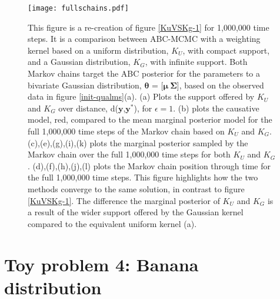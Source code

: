 \begin{figure}[H]
	\centering
	\texttt{[image: fullschains.pdf]}
	\caption{ This figure is a re-creation of figure \ref{KuVSKg-1} for 1,000,000 time steps. It is a comparison between ABC-MCMC with a weighting kernel based on a uniform distribution, $K_U$, with compact support, and a Gaussian distribution, $K_G$, with infinite support. Both Markov chains target the ABC posterior for the parameters to a bivariate Gaussian distribution, $\bm{\theta}$ = [$\bm{\mu}\ \bm{\Sigma}$], based on the observed data in figure \ref{init-qualms}(a). (a) Plots the support offered by $K_U$ and $K_G$ over distance, d($\bm{y}$,$\bm{y^*}$), for $\epsilon=1$. (b) plots the causative model, red, compared to the mean marginal posterior model for the full 1,000,000 time steps of the Markov chain based on $K_U$ and $K_G$. (c),(e),(g),(i),(k) plots the marginal posterior sampled by the Markov chain over the full 1,000,000 time steps for both $K_U$ and $K_G$. (d),(f),(h),(j),(l) plots the Markov chain position through time for the full 1,000,000 time steps. This figure highlights how the two methods converge to the same solution, in contrast to figure \ref{KuVSKg-1}. The difference the marginal posterior of $K_U$ and $K_G$ is a result of the wider support offered by the Gaussian kernel compared to the equivalent uniform kernel (a).}
	\label{KuVSKg-2}
\end{figure} 

\section{Toy problem 4: Banana distribution}
\label{banana-section}

